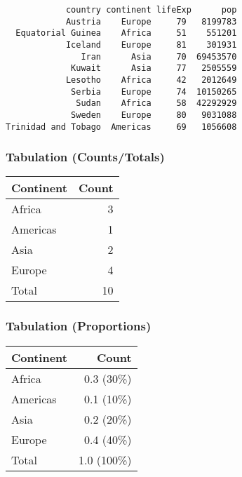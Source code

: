 \documentclass[17pt]{beamer} %
\begin{document}
\begin{frame}[fragile]
\footnotesize
\begin{verbatim}
            country continent lifeExp      pop
            Austria    Europe     79   8199783
  Equatorial Guinea    Africa     51    551201
            Iceland    Europe     81    301931
               Iran      Asia     70  69453570
             Kuwait      Asia     77   2505559
            Lesotho    Africa     42   2012649
             Serbia    Europe     74  10150265
              Sudan    Africa     58  42292929
             Sweden    Europe     80   9031088
Trinidad and Tobago  Americas     69   1056608
\end{verbatim}
\end{frame}


\begin{frame}[fragile]
\frametitle{\normalsize Tabulation (Counts/Totals)}
\begin{center}
\begin{tabular}{lr} \midrule
Continent & Count \\ \midrule
Africa & 3 \\
Americas & 1 \\
Asia & 2 \\
Europe & 4 \\ \midrule
Total & 10 \\ \midrule
\end{tabular}
\end{center}
\end{frame}


\begin{frame}[fragile]
\frametitle{\normalsize Tabulation (Proportions)}
\begin{center}
\begin{tabular}{lr} \midrule
Continent & Count \\ \midrule
Africa & 0.3 (30\%) \\
Americas & 0.1 (10\%) \\
Asia & 0.2 (20\%) \\
Europe & 0.4 (40\%) \\ \midrule
Total & 1.0 (100\%) \\ \midrule
\end{tabular}
\end{center}
\end{frame}

\end{document}
